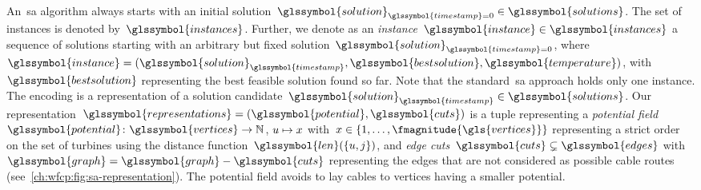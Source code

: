 An~\gls{sa} algorithm always starts with an initial
solution~$\glssymbol{solution}_{\glssymbol{timestamp} = 0}\in
\glssymbol{solutions}$. The set
of instances
is denoted by~$\glssymbol{instances}$. Further, we denote as an
\emph{instance}~$\glssymbol{instance}\in\glssymbol{instances}$ a sequence of
solutions starting with an arbitrary but fixed
solution~$\glssymbol{solution}_{\glssymbol{timestamp} = 0}$, where~$
\glssymbol{instance}=(\glssymbol{solution}_{\glssymbol{timestamp}},
\glssymbol{bestsolution}, \glssymbol{temperature})$,
with~$\glssymbol{bestsolution}$ representing the best feasible solution found so
far. Note that the standard~\gls{sa} approach holds only one instance. The
encoding is a representation of a solution
candidate~$\glssymbol{solution}_{\glssymbol{timestamp}}\in\glssymbol{solutions}$.
Our representation~$\glssymbol{representations}=(\glssymbol{potential},
\glssymbol{cuts})$ is a tuple representing a \emph{potential
field}~$\glssymbol{potential}\colon\glssymbol{vertices}\to\naturals$,
$u\mapsto x$ with~$x\in\{1,\dots,\fmagnitude{\gls{vertices}}\}$
representing a strict order on the set of turbines using the distance
function~$\glssymbol{len}(\{\vertexa,\substation\})$,
and \emph{edge cuts}~$\glssymbol{cuts}\subsetneq
\glssymbol{edges}$ with~$\glssymbol{graph}=\glssymbol{graph}-\glssymbol{cuts}$
representing the edges that are not considered as possible cable routes
(see~\cref{ch:wfcp:fig:sa-representation}). The potential field
avoids to lay cables to vertices having a smaller potential.
% 
